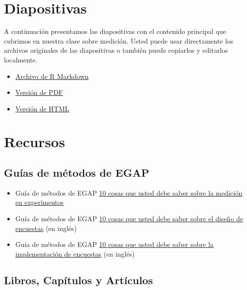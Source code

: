 \documentclass[12pt,spanish,]{book}
\begin{document}
\hypertarget{diapositivas-6}{%
\section{Diapositivas}\label{diapositivas-6}}

A continuación presentamos las diapositivas con el contenido principal que cubrimos en nuestra clase sobre medición. Usted puede usar directamente los archivos originales de las diapositivas o también puede copiarlos y editarlos localmente.

\begin{itemize}
\item
  \href{https://egap.github.io/learningdays-resources/Slides_esp/measurement-slides.Rmd}{Archivo de R Markdown}
\item
  \href{https://egap.github.io/learningdays-resources/Slides_esp/measurement-slides.pdf}{Versión de PDF}
\item
  \href{https://egap.github.io/learningdays-resources/Slides_esp/measurement-slides.html}{Versión de HTML}
\end{itemize}

\hypertarget{recursos-6}{%
\section{Recursos}\label{recursos-6}}

\hypertarget{guuxedas-de-muxe9todos-de-egap-5}{%
\subsection{Guías de métodos de EGAP}\label{guuxedas-de-muxe9todos-de-egap-5}}

\begin{itemize}
\item
  Guía de métodos de EGAP \href{https://egap.org/es/resource/10-cosas-que-debe-saber-sobre-la-medicion-en-experimentos/}{10 cosas que usted debe saber sobre la medición en experimentos}
\item
  Guía de métodos de EGAP \href{https://egap.org/resource/10-things-to-know-about-survey-design/}{10 cosas que usted debe saber sobre el diseño de encuestas} (en inglés)
\item
  Guía de métodos de EGAP \href{https://egap.org/resource/10-things-to-know-about-survey-implementation/}{10 cosas que usted debe saber sobre la implementación de encuestas} (en inglés)
\end{itemize}

\hypertarget{libros-capuxedtulos-y-artuxedculos-4}{%
\subsection{Libros, Capítulos y Artículos}\label{libros-capuxedtulos-y-artuxedculos-4}}
\end{document}
